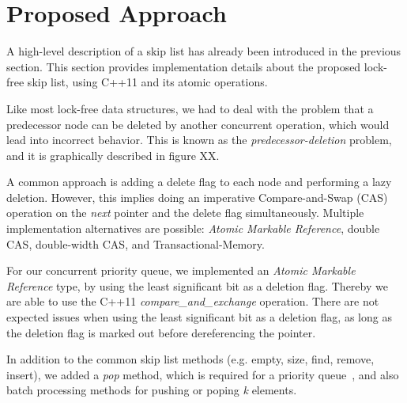 \section{Proposed Approach}\label{sec:approach}
A high-level description of a skip list has already been introduced in the previous section.
This section provides implementation details about the proposed lock-free skip list, using C++11 and its atomic operations.

Like most lock-free data structures, we had to deal with the problem that a predecessor node can be deleted by another concurrent operation, which would lead into incorrect behavior. This is known as the {\em predecessor-deletion} problem, and it is graphically described in figure XX.%

A common approach is adding a delete flag to each node and performing a lazy deletion. However, this implies doing an imperative Compare-and-Swap (CAS) operation on the {\em next} pointer and the delete flag simultaneously.
Multiple implementation alternatives are possible: {\em Atomic Markable Reference}, double CAS, double-width CAS, and Transactional-Memory.

For our concurrent priority queue, we implemented an {\em Atomic Markable Reference} type, by using the least significant bit as a deletion flag. Thereby we are able to use the C++11 {\em compare\_and\_exchange} operation.
There are not expected issues when using the least significant bit as a deletion flag, as long as the deletion flag is marked out before dereferencing the pointer.

In addition to the common skip list methods (e.g. empty, size, find, remove, insert), we added a \textit{pop} method, which is required for a priority queue~\cite{Herlihy:2008:AMP:1734069}, and also batch processing methods for pushing or poping \textit{k} elements.



